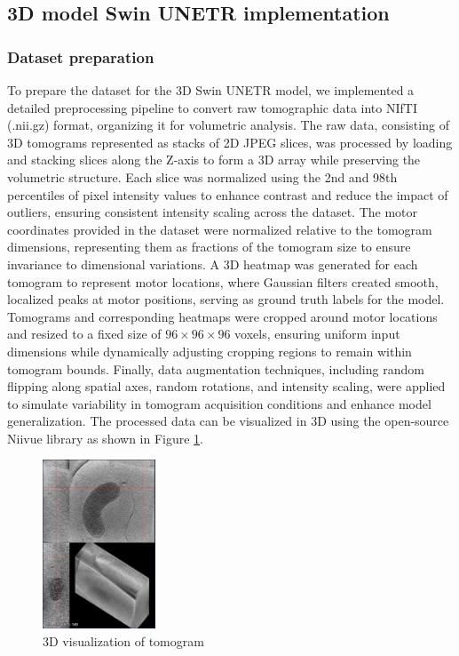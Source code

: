 \documentclass{article}
\begin{document}
\subsection{3D model Swin UNETR implementation}

\subsubsection{Dataset preparation}
To prepare the dataset for the 3D Swin UNETR model, we implemented a detailed preprocessing pipeline to convert raw tomographic data into NIfTI (.nii.gz) format, organizing it for volumetric analysis. 
The raw data, consisting of 3D tomograms represented as stacks of 2D JPEG slices, was processed by loading and stacking slices along the Z-axis to form a 3D array while preserving the volumetric structure. 
Each slice was normalized using the 2nd and 98th percentiles of pixel intensity values to enhance contrast and reduce the impact of outliers, ensuring consistent intensity scaling across the dataset. The motor coordinates provided in the dataset were normalized relative to the tomogram dimensions, representing them as fractions of the tomogram size to ensure invariance to dimensional variations. 
A 3D heatmap was generated for each tomogram to represent motor locations, where Gaussian filters created smooth, localized peaks at motor positions, serving as ground truth labels for the model. Tomograms and corresponding heatmaps were cropped around motor locations and resized to a fixed size of \(96 \times 96 \times 96\) voxels, ensuring uniform input dimensions while dynamically adjusting cropping regions to remain within tomogram bounds. 
Finally, data augmentation techniques, including random flipping along spatial axes, random rotations, and intensity scaling, were applied to simulate variability in tomogram acquisition conditions and enhance model generalization. 
The processed data can be visualized in 3D using the open-source Niivue library as shown in Figure \ref{fig:3d_visualization}.

\begin{figure}[htb]
    \centering
    \includegraphics[width=0.3\textwidth]{images/3D view of tomogram.png}
    \caption{3D visualization of tomogram}
    \label{fig:3d_visualization}
\end{figure}
\end{document}
